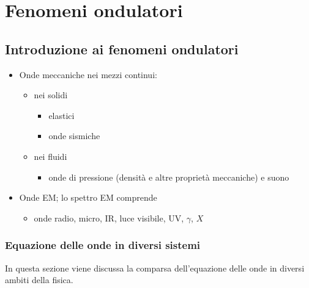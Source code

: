 \documentclass[letterpaper,10pt,italian]{jupyterBook}
\begin{document}
\part{Fenomeni ondulatori}

\sphinxstepscope


\chapter{Introduzione ai fenomeni ondulatori}
\label{\detokenize{ch/waves/intro:introduzione-ai-fenomeni-ondulatori}}\label{\detokenize{ch/waves/intro:physics-hs-waves-intro}}\label{\detokenize{ch/waves/intro::doc}}\begin{itemize}
\item {} 
\sphinxAtStartPar
Onde meccaniche nei mezzi continui:
\begin{itemize}
\item {} 
\sphinxAtStartPar
nei solidi
\begin{itemize}
\item {} 
\sphinxAtStartPar
elastici

\item {} 
\sphinxAtStartPar
onde sismiche

\end{itemize}

\item {} 
\sphinxAtStartPar
nei fluidi
\begin{itemize}
\item {} 
\sphinxAtStartPar
onde di pressione (densità e altre proprietà meccaniche) e suono

\end{itemize}

\end{itemize}

\item {} 
\sphinxAtStartPar
Onde EM; lo spettro EM comprende
\begin{itemize}
\item {} 
\sphinxAtStartPar
onde radio, micro, IR, luce visibile, UV, \(\gamma\), \(X\)

\end{itemize}

\end{itemize}


\section{Equazione delle onde in diversi sistemi}
\label{\detokenize{ch/waves/intro:equazione-delle-onde-in-diversi-sistemi}}\label{\detokenize{ch/waves/intro:physics-hs-waves-equation-examples}}
\sphinxAtStartPar
In questa sezione viene discussa la comparsa dell’equazione delle onde in diversi ambiti della fisica.
\end{document}
